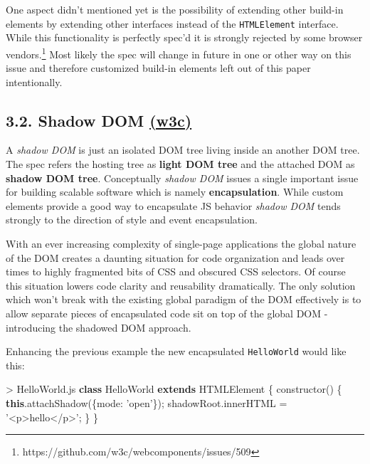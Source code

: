 \documentclass[]{article}
\newenvironment{Shaded}{}{}
\newcommand{\KeywordTok}[1]{\textcolor[rgb]{0.00,0.44,0.13}{\textbf{{#1}}}}
\newcommand{\DataTypeTok}[1]{\textcolor[rgb]{0.56,0.13,0.00}{{#1}}}
\newcommand{\StringTok}[1]{\textcolor[rgb]{0.25,0.44,0.63}{{#1}}}
\newcommand{\VariableTok}[1]{\textcolor[rgb]{0.10,0.09,0.49}{{#1}}}
\newcommand{\OperatorTok}[1]{\textcolor[rgb]{0.40,0.40,0.40}{{#1}}}
\newcommand{\AttributeTok}[1]{\textcolor[rgb]{0.49,0.56,0.16}{{#1}}}
\newcommand{\NormalTok}[1]{{#1}}
\begin{document}
One aspect didn't mentioned yet is the possibility of extending other
build-in elements by extending other interfaces instead of the
\texttt{HTMLElement} interface. While this functionality is perfectly
spec'd it is strongly rejected by some browser vendors.\footnote{https://github.com/w3c/webcomponents/issues/509}
Most likely the spec will change in future in one or other way on this
issue and therefore customized build-in elements left out of this paper
intentionally.

\subsection{\texorpdfstring{3.2. Shadow DOM
\href{http://w3c.github.io/webcomponents/spec/shadow/}{(w3c)}}{3.2. Shadow DOM (w3c)}}\label{shadow-dom-w3c}

A \emph{shadow DOM} is just an isolated DOM tree living inside an
another DOM tree. The spec refers the hosting tree as \textbf{light DOM
tree} and the attached DOM as \textbf{shadow DOM tree}. Conceptually
\emph{shadow DOM} issues a single important issue for building scalable
software which is namely \textbf{encapsulation}. While custom elements
provide a good way to encapsulate JS behavior \emph{shadow DOM} tends
strongly to the direction of style and event encapsulation.

With an ever increasing complexity of single-page applications the
global nature of the DOM creates a daunting situation for code
organization and leads over times to highly fragmented bits of CSS and
obscured CSS selectors. Of course this situation lowers code clarity and
reusability dramatically. The only solution which won't break with the
existing global paradigm of the DOM effectively is to allow separate
pieces of encapsulated code sit on top of the global DOM - introducing
the shadowed DOM approach.

Enhancing the previous example the new encapsulated \texttt{HelloWorld}
would like this:

\begin{Shaded}
\begin{Highlighting}[]
\OperatorTok{>} \VariableTok{HelloWorld}\NormalTok{.}\AttributeTok{js}
\KeywordTok{class} \NormalTok{HelloWorld }\KeywordTok{extends} \NormalTok{HTMLElement }\OperatorTok{\{}
 \AttributeTok{constructor}\NormalTok{() }\OperatorTok{\{}
   \KeywordTok{this}\NormalTok{.}\AttributeTok{attachShadow}\NormalTok{(}\OperatorTok{\{}\DataTypeTok{mode}\OperatorTok{:} \StringTok{'open'}\OperatorTok{\}}\NormalTok{)}\OperatorTok{;}
   \VariableTok{shadowRoot}\NormalTok{.}\AttributeTok{innerHTML} \OperatorTok{=} \StringTok{'<p>hello</p>'}\OperatorTok{;}
 \OperatorTok{\}}
\OperatorTok{\}}
\end{Highlighting}
\end{Shaded}
\end{document}
